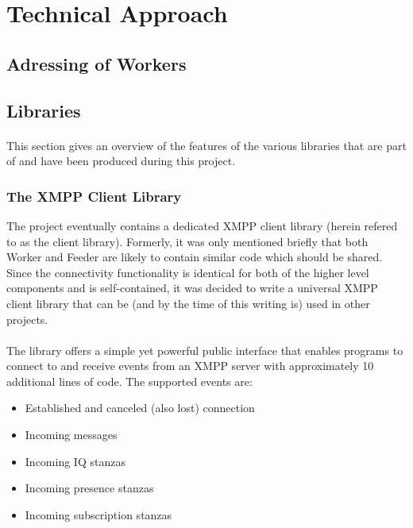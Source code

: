 \section{Technical Approach}
\paragraph{}

\subsection{Adressing of Workers}
\paragraph{}


\subsection{Libraries}
\paragraph{}
This section gives an overview of the features of the various libraries that are part of and have been produced during this project.

\subsubsection{The XMPP Client Library}
The project eventually contains a dedicated XMPP client library (herein refered to as the client library). Formerly, it was only mentioned briefly that both Worker and Feeder are likely to contain similar code which should be shared. Since the connectivity functionality is identical for both of the higher level components and is self-contained, it was decided to write a universal XMPP client library that can be (and by the time of this writing is) used in other projects.
\paragraph{}
The library offers a simple yet powerful public interface that enables programs to connect to and receive events from an XMPP server with approximately 10 additional lines of code. The supported events are:
\begin{itemize}
\item Established and canceled (also lost) connection
\item Incoming messages
\item Incoming IQ stanzas
\item Incoming presence stanzas
\item Incoming subscription stanzas
\end{itemize}
